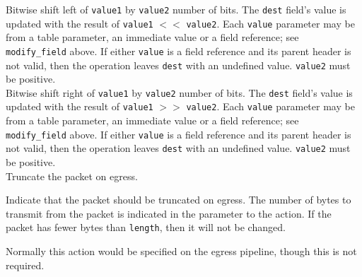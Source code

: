 \documentclass[12pt]{article}
\begin{document}

{ %
Bitwise shift left of \texttt{value1} by \texttt{value2} number of bits.
}
{ %
}
{ %
The \texttt{dest} field's value is updated with the result of 
\texttt{value1} $<<$ \texttt{value2}. Each \texttt{value} parameter may be from a
table parameter, an immediate value or a field reference; see \texttt{modify_field} above. If either \texttt{value}
is a field reference and its parent header is not valid, then the operation
leaves \texttt{dest} with an undefined value. \texttt{value2} must be positive.
}\\


{ %
Bitwise shift right of \texttt{value1} by \texttt{value2} number of bits.
}
{ %
}
{ %
The \texttt{dest} field's value is updated with the result of 
\texttt{value1} $>>$ \texttt{value2}. Each \texttt{value} parameter may be from a
table parameter, an immediate value or a field reference; see \texttt{modify_field} above. If either \texttt{value}
is a field reference and its parent header is not valid, then the operation
leaves \texttt{dest} with an undefined value. \texttt{value2} must be positive.
}\\


{ %
Truncate the packet on egress.
}
{ %
}
{ %
Indicate that the packet should be truncated on egress.  The number of bytes 
to transmit from the packet is indicated in the parameter to the action.  If 
the packet has fewer bytes than \texttt{length}, then it will not be changed.

Normally this action would be specified on the egress pipeline, though this 
is not required.
}
\end{document}
